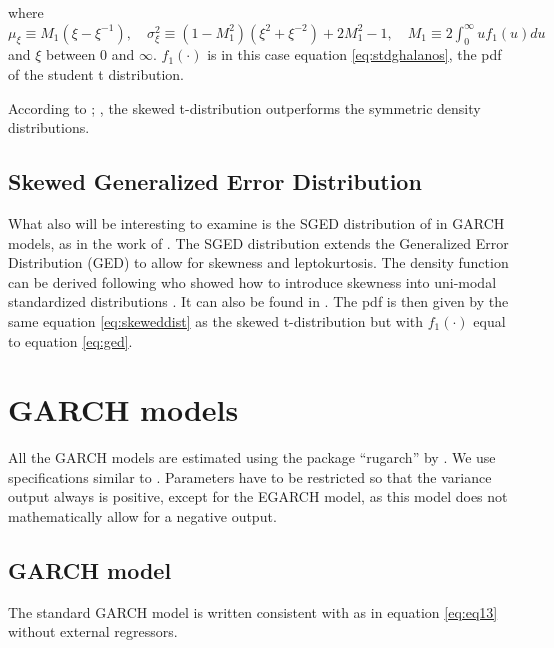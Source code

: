 \documentclass[a4paper, twoside]{templates/ociamthesis}
\begin{document}
\noindent where \(\mu_{\xi} \equiv M_{1}\left(\xi-\xi^{-1}\right), \quad \sigma_{\xi}^{2} \equiv\left(1-M_{1}^{2}\right)\left(\xi^{2}+\xi^{-2}\right)+2 M_{1}^{2}-1, \quad M_{1} \equiv 2 \int_{0}^{\infty} u f_{1}(u) d u\) and \(\xi\) between \(0\) and \(\infty\). \(f_1(\cdot)\) is in this case equation \eqref{eq:stdghalanos}, the pdf of the student t distribution.

\noindent According to \textcite{giot2003}; \textcite{giot2004}, the skewed t-distribution outperforms the symmetric density distributions.

\hypertarget{skewed-generalized-error-distribution}{%
\subsection{Skewed Generalized Error Distribution}\label{skewed-generalized-error-distribution}}

\noindent What also will be interesting to examine is the SGED distribution of \textcite{theodossiou2000} in GARCH models, as in the work of \textcite{lee2008}. The SGED distribution extends the Generalized Error Distribution (GED) to allow for skewness and leptokurtosis. The density function can be derived following \textcite{fernández1998} who showed how to introduce skewness into uni-modal standardized distributions \autocite{trottier2015}. It can also be found in \textcite{theodossiou2000}. The pdf is then given by the same equation \eqref{eq:skeweddist} as the skewed t-distribution but with \(f_1(\cdot)\) equal to equation \eqref{eq:ged}.

\hypertarget{garch-models-1}{%
\section{GARCH models}\label{garch-models-1}}

All the GARCH models are estimated using the package ``rugarch'' by \textcite{alexios2020}. We use specifications similar to \textcite{ghalanos2020}. Parameters have to be restricted so that the variance output always is positive, except for the EGARCH model, as this model does not mathematically allow for a negative output.

\hypertarget{garch-model}{%
\subsection{GARCH model}\label{garch-model}}

\noindent The standard GARCH model \autocite{bollerslev1986} is written consistent with \textcite{ghalanos2020} as in equation \eqref{eq:eq13} without external regressors.
\end{document}
